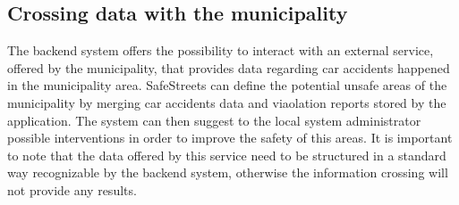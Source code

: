 \subsection{Crossing data with the municipality}
The backend system offers the possibility to interact with an external service, offered by the municipality, that provides data regarding car accidents happened in the municipality area. SafeStreets can define the potential unsafe areas of the municipality by merging car accidents data and viaolation reports stored by the application. The system can then suggest to the local system administrator possible interventions in order to improve the safety of this areas. It is important to note that the data offered by this service need to be structured in a standard way recognizable by the backend system, otherwise the information crossing will not provide any results.

